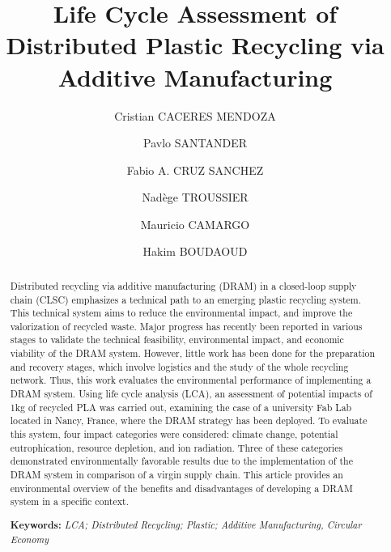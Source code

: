 \documentclass[12pt]{elsarticle} %
\begin{document}
\begin{frontmatter}

  \title{Life Cycle Assessment of Distributed Plastic Recycling via Additive Manufacturing}
    \author[UL]{Cristian CACERES MENDOZA%
  }
    \author[USACH]{Pavlo SANTANDER%
  }
  
    \author[UL]{Fabio A. CRUZ SANCHEZ%
  }
  
    \author[CREIDD]{Nadège TROUSSIER%
  }
  
    \author[UL]{Mauricio CAMARGO%
  }
  
    \author[UL]{Hakim BOUDAOUD%
  }
  
  
  \begin{abstract}
  Distributed recycling via additive manufacturing (DRAM) in a closed-loop supply chain (CLSC) emphasizes a technical path to an emerging plastic recycling system. This technical system aims to reduce the environmental impact, and improve the valorization of recycled waste. Major progress has recently been reported in various stages to validate the technical feasibility, environmental impact, and economic viability of the DRAM system. However, little work has been done for the preparation and recovery stages, which involve logistics and the study of the whole recycling network. Thus, this work evaluates the environmental performance of implementing a DRAM system. Using life cycle analysis (LCA), an assessment of potential impacts of 1kg of recycled PLA was carried out, examining the case of a university Fab Lab located in Nancy, France, where the DRAM strategy has been deployed. To evaluate this system, four impact categories were considered: climate change, potential eutrophication, resource depletion, and ion radiation. Three of these categories demonstrated environmentally favorable results due to the implementation of the DRAM system in comparison of a virgin supply chain. This article provides an environmental overview of the benefits and disadvantages of developing a DRAM system in a specific context.

  \textbf{Keywords:} \emph{LCA; Distributed Recycling; Plastic; Additive Manufacturing, Circular Economy}
  \end{abstract}
  
 \end{frontmatter}
\end{document}
